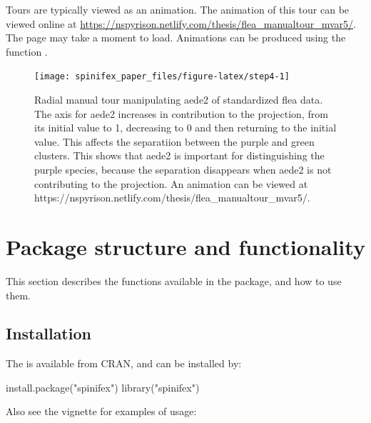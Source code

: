 Tours are typically viewed as an animation. The animation of this tour
can be viewed online at
\url{https://nspyrison.netlify.com/thesis/flea_manualtour_mvar5/}. The
page may take a moment to load. Animations can be produced using the
function .

\begin{Schunk}
\begin{figure}

{\centering \texttt{[image: spinifex\_paper\_files/figure-latex/step4-1]} 

}

\caption[Radial manual tour manipulating aede2 of standardized flea data]{Radial manual tour manipulating aede2 of standardized flea data. The axis for aede2 increases in contribution to the projection, from its initial value to 1, decreasing to 0 and then returning to the initial value. This affects the separatiion between the purple and green clusters. This shows that aede2 is important for distinguishing the purple species, because the separation disappears when aede2 is not contributing to the projection. An animation can be viewed at https://nspyrison.netlify.com/thesis/flea\_manualtour\_mvar5/.}\label{fig:step4}
\end{figure}
\end{Schunk}

\hypertarget{sec:usage}{%
\section{Package structure and functionality}\label{sec:usage}}

This section describes the functions available in the package, and how
to use them.

\hypertarget{installation}{%
\subsection{Installation}\label{installation}}

The  is available from CRAN, and can be installed by:

\begin{Schunk}
\begin{Sinput}
install.package("spinifex")
library("spinifex")
\end{Sinput}
\end{Schunk}

\noindent Also see the vignette for examples of usage:

